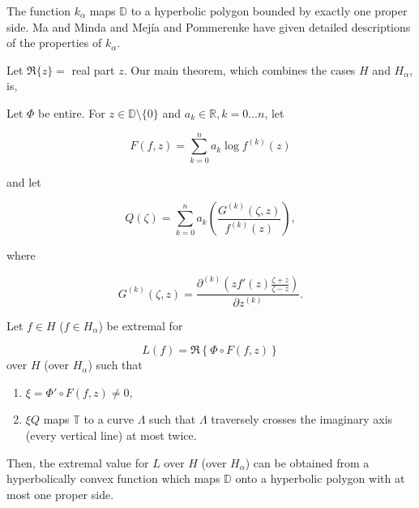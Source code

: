 \documentclass[final]{siamltex}
\newcommand{\dsp}{\displaystyle}
\newcommand{\R}{\mathbb{R}}
\newcommand{\T}{\mathbb{T}}
\newcommand{\D}{\mathbb{D}}
\begin{document}
\noindent The function $k_{\alpha}$ maps $\D$ to a hyperbolic polygon bounded by exactly one proper side.  Ma and Minda \cite{MM94, MM99} and Mej\'ia and Pommerenke \cite{PM00} have given detailed descriptions of the properties of $k_{\alpha}$.  

Let $\Re\{z\} = $ real part $z$.  Our main theorem, which combines the cases $H$ and $H_{\alpha}$, is, 

\vspace{0.1in}

\begin{theorem}
Let $\Phi$ be 
entire. For $z \in \D \setminus \{0\}$ and $a_k \in \R, k=0 \dots n$, let 

\begin{equation}
\label{eqnF}
{\dsp F(f,z) = \sum_{k=0}^n a_k \log {f^{(k)}(z)}}
\end{equation}

\noindent and let 

\begin{equation}
\label{eqnQ}
{\dsp Q(\zeta) = \sum_{k=0}^n a_k \left ( \frac{G^{(k)}(\zeta,z)}{f^{(k)}(z)} \right )},
\end{equation}

\noindent where

\begin{equation}
\label{eqnG}
{\dsp G^{(k)}(\zeta,z) = \frac{\partial^{(k)} \left (zf'(z)\frac{\zeta +z}{\zeta - z} \right )}{\partial z^{(k)}}}.
\end{equation}

\noindent Let $f \in H$ ($f \in H_{\alpha}$) be extremal for 

\begin{equation}
\label{funcL}
L(f) = \Re \left\{ \Phi \circ F(f,z) \right\}
\end{equation}
over $H$ (over $H_{\alpha}$) such that 
\begin{enumerate}
\item $\xi  = \Phi ' \circ F(f,z) \ne  0 $,

\item $\xi Q$ maps $\T$ to a curve $\Lambda$ such that $\Lambda$ traversely crosses the imaginary axis (every vertical line) at most twice.
\end{enumerate}

\noindent Then, the extremal value for $L$ over $H$ (over $H_{\alpha}$) can be obtained from a hyperbolically convex function which maps $\D$ onto a hyperbolic polygon with at most one proper side.

\end{theorem}
\end{document}
